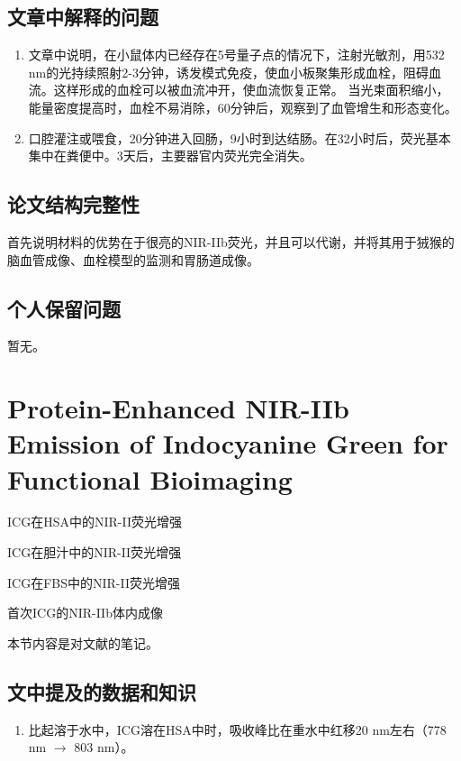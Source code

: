 \documentclass[cn,11pt,chinese]{elegantbook}
\begin{document}
\subsection{文章中解释的问题}
\begin{enumerate}[itemsep=1.5ex]
   \item {}
  文章中说明，在小鼠体内已经存在5号量子点的情况下，注射光敏剂，用532 nm的光持续照射2-3分钟，诱发模式免疫，使血小板聚集形成血栓，阻碍血流。这样形成的血栓可以被血流冲开，使血流恢复正常。
  当光束面积缩小，能量密度提高时，血栓不易消除，60分钟后，观察到了血管增生和形态变化。
   \item {}
口腔灌注或喂食，20分钟进入回肠，9小时到达结肠。在32小时后，荧光基本集中在粪便中。3天后，主要器官内荧光完全消失。
 \end{enumerate} 

\subsection{论文结构完整性}
首先说明材料的优势在于很亮的NIR-IIb荧光，并且可以代谢，并将其用于狨猴的脑血管成像、血栓模型的监测和胃肠道成像。

\subsection{个人保留问题}
暂无。

\section{Protein-Enhanced NIR-IIb Emission of Indocyanine Green for Functional Bioimaging}
\begin{introduction}[创新点概要]
  \item ICG在HSA中的NIR-II荧光增强
  \item ICG在胆汁中的NIR-II荧光增强
  \item ICG在FBS中的NIR-II荧光增强
  \item 首次ICG的NIR-IIb体内成像
\end{introduction}

本节内容是对文献\cite{Hemubin2020}的笔记。

\subsection{文中提及的数据和知识}
\begin{enumerate}
  \item 比起溶于水中，ICG溶在HSA中时，吸收峰比在重水中红移20 nm左右（778 nm $\to$ 803 nm）。
\end{enumerate}
\end{document}
